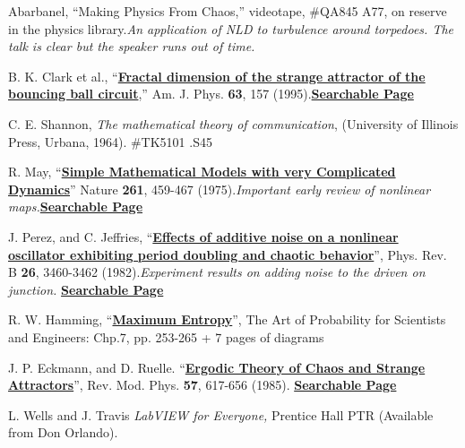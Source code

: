 \documentclass{../lab}
\begin{document}
\begin{thebibliography}{}
     Abarbanel, ``Making Physics From Chaos,'' videotape, \#QA845 A77, on reserve in the physics library.\emph{An application of NLD to turbulence around torpedoes. The talk is clear but the speaker runs out of time.}

     B. K. Clark et al., ``\href{http://ajp.aapt.org/resource/1/ajpias/v63/i2/p157\_s1}{\textbf{Fractal dimension of the strange attractor of the bouncing ball circuit}},'' Am. J. Phys. \textbf{63}, 157 (1995).\href{http://physics111.lib.berkeley.edu/Physics111/Reprints/NLD/15-Fractal\_Dimension.pdf}{\textbf{Searchable Page}}

     C. E. Shannon, \emph{The mathematical theory of communication}, (University of Illinois Press, Urbana, 1964). \#TK5101 .S45

     R. May, ``\href{http://www.nature.com/nature/journal/v261/n5560/abs/261459a0.html}{\textbf{Simple Mathematical Models with very Complicated Dynamics}}'' Nature \textbf{261}, 459-467 (1975).\emph{Important early review of nonlinear maps.}\href{http://physics111.lib.berkeley.edu/Physics111/Reprints/NLD/04-Simple\_Mathematical\_Models.pdf}{\textbf{Searchable Page}}

     J. Perez, and C. Jeffries, ``\href{http://prb.aps.org/abstract/PRB/v26/i6/p3460\_1}{\textbf{Effects of additive noise on a nonlinear oscillator exhibiting period doubling and chaotic behavior}}'', Phys. Rev. B \textbf{26}, 3460-3462 (1982).\emph{Experiment results on adding noise to the driven on junction.} \href{http://physics111.lib.berkeley.edu/Physics111/Reprints/NLD/10-Effects\_of\_Additive\_Noise.pdf}{\textbf{Searchable Page}}

     R. W. Hamming, ``\href{http://physics111.lib.berkeley.edu/Physics111/Reprints/NLD/12-Maximum\_Entropy.pdf}{\textbf{Maximum Entropy}}'', The Art of Probability for Scientists and Engineers: Chp.7, pp. 253-265 + 7 pages of diagrams

     J. P. Eckmann, and D. Ruelle. ``\href{http://rmp.aps.org/abstract/RMP/v57/i3/p617\_1}{\textbf{Ergodic Theory of Chaos and Strange Attractors}}'', Rev. Mod. Phys. \textbf{57}, 617-656 (1985). \href{http://physics111.lib.berkeley.edu/Physics111/Reprints/NLD/17-Ergodic\_Theory.pdf}{\textbf{Searchable Page}}

     L. Wells and J. Travis \emph{LabVIEW for Everyone, }Prentice Hall PTR (Available from Don Orlando).
\end{thebibliography}
\endgroup
\end{document}
